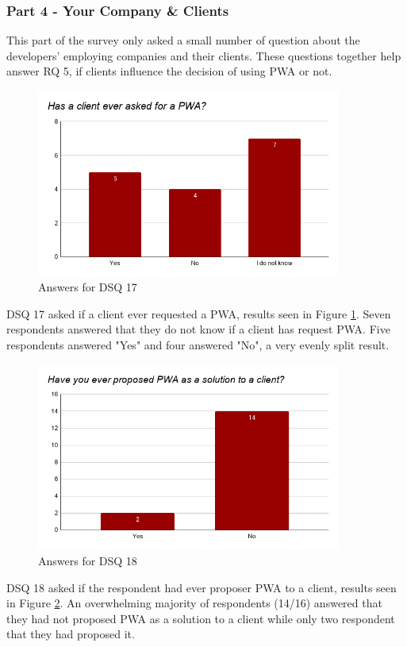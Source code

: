 \documentclass[a4paper,12pt]{article}
\begin{document}
\subsubsection{Part 4 - Your Company \& Clients}
\label{Results_dev_part4}
This part of the survey only asked a small number of question about the developers' employing companies and their clients. These questions together help answer RQ 5, if clients influence the decision of using PWA or not.

\begin{figure}[ht!]
    \centering
    \includegraphics[width=10cm]{img/Results/dsq17.png}
    \caption{Answers for DSQ 17}
    \label{fig:res_devq17}
\end{figure}

DSQ 17 asked if a client ever requested a PWA, results seen in Figure \ref{fig:res_devq17}. Seven respondents answered that they do not know if a client has request PWA. Five respondents answered "Yes" and four answered "No", a very evenly split result.

\begin{figure}[ht!]
    \centering
    \includegraphics[width=10cm]{img/Results/dsq18.png}
    \caption{Answers for DSQ 18}
    \label{fig:res_devq18}
\end{figure}

DSQ 18 asked if the respondent had ever proposer PWA to a client, results seen in Figure \ref{fig:res_devq18}. An overwhelming majority of respondents (14/16) answered that they had not proposed PWA as a solution to a client while only two respondent that they had proposed it.
\end{document}
